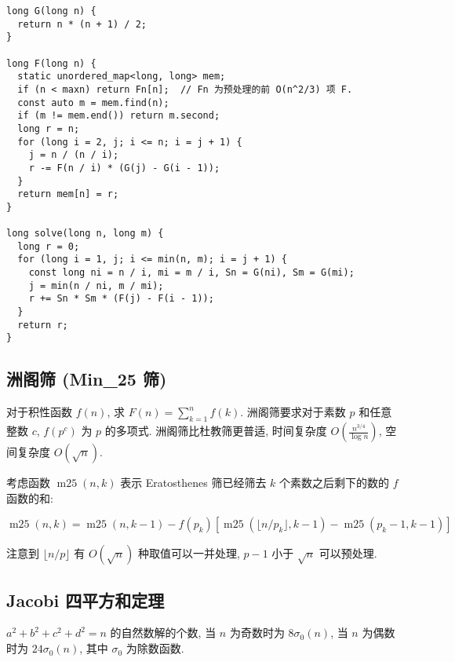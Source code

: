 \begin{lstlisting}
long G(long n) {
  return n * (n + 1) / 2;
}

long F(long n) {
  static unordered_map<long, long> mem;
  if (n < maxn) return Fn[n];  // Fn 为预处理的前 O(n^2/3) 项 F.
  const auto m = mem.find(n);
  if (m != mem.end()) return m.second;
  long r = n;
  for (long i = 2, j; i <= n; i = j + 1) {
    j = n / (n / i);
    r -= F(n / i) * (G(j) - G(i - 1));
  }
  return mem[n] = r;
}

long solve(long n, long m) {
  long r = 0;
  for (long i = 1, j; i <= min(n, m); i = j + 1) {
    const long ni = n / i, mi = m / i, Sn = G(ni), Sm = G(mi);
    j = min(n / ni, m / mi);
    r += Sn * Sm * (F(j) - F(i - 1));
  }
  return r;
}
\end{lstlisting}

\subsection{洲阁筛 (Min\_25 筛)}

对于积性函数 $f(n)$, 求 $\displaystyle F(n)=\sum_{k=1}^nf(k)$. 洲阁筛要求对于素数 $p$ 和任意整数 $c$, $f(p^c)$ 为 $p$ 的多项式. 洲阁筛比杜教筛更普适, 时间复杂度 $O\left(\frac{n^{3/4}}{\log n}\right)$, 空间复杂度 $O(\sqrt n)$.

考虑函数 $\operatorname{m25}(n,k)$ 表示 Eratosthenes 筛已经筛去 $k$ 个素数之后剩下的数的 $f$ 函数的和:

\[\operatorname{m25}(n,k)=\operatorname{m25}(n,k-1)-f(p_k)[\operatorname{m25}(\lfloor n/p_k\rfloor,k-1)-\operatorname{m25}(p_k-1,k-1)]\]

注意到 $\lfloor n/p\rfloor$ 有 $O(\sqrt n)$ 种取值可以一并处理, $p-1$ 小于 $\sqrt n$ 可以预处理.

\subsection{Jacobi 四平方和定理}
$a^2+b^2+c^2+d^2=n$ 的自然数解的个数, 当 $n$ 为奇数时为 $8\sigma_0(n)$, 当 $n$ 为偶数时为 $24\sigma_0(n)$, 其中 $\sigma_0$ 为除数函数.
